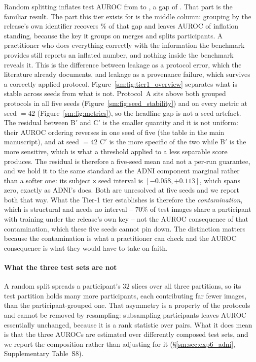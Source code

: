 \documentclass[11pt]{article}
\begin{document}
Random splitting inflates test AUROC from \TierOneTrueAUROC{} to
\TierOneRandomAUROC{}, a gap of \TierOneGapTotal{}. That part is the
familiar result. The part this tier exists for is the middle column:
grouping by the release's own identifier recovers
\TierOneShareFilename\% of that gap and leaves \TierOneGapResidual{}
AUROC of inflation standing, because the key it groups on merges and
splits participants. A practitioner who does everything correctly with
the information the benchmark provides still reports an inflated number,
and nothing inside the benchmark reveals it. This is the difference
between leakage as a protocol error, which the literature already
documents, and leakage as a provenance failure, which survives a
correctly applied protocol.
Figure~\ref{sm:fig:tier1_overview} separates what is stable across seeds
from what is not. Protocol~A sits above both grouped protocols in all
five seeds (Figure~\ref{sm:fig:seed_stability}) and on every metric at
seed $=42$ (Figure~\ref{sm:fig:metrics}), so the headline gap is not a
seed artefact. The residual between B$'$ and C$'$ is the smaller
quantity and it is not uniform: their AUROC ordering reverses in one
seed of five (the table in the main manuscript), and at seed $=42$ C$'$ is
the more specific of the two while B$'$ is the more sensitive, which is
what a threshold applied to a less separable score produces. The
\TierOneGapResidual{} residual is therefore a five-seed mean and not a
per-run guarantee, and we hold it to the same standard as the ADNI
component marginal rather than a softer one: its
subject\,$\times$\,seed interval is $[-0.058, +0.113]$, which spans
zero, exactly as ADNI's \AdniMarginal{} \AdniMarginalCI{} does. Both
are unresolved at five seeds and we report both that way. What the
Tier-1 tier establishes is therefore the \emph{contamination}, which is
structural and needs no interval -- $70\%$ of test images share a
participant with training under the release's own key -- not the AUROC
consequence of that contamination, which these five seeds cannot pin
down. The distinction matters because the contamination is what a
practitioner can check and the AUROC consequence is what they would
have to take on faith.



\paragraph{What the three test sets are not}
A random split spreads a participant's $32$ slices over all three
partitions, so its test partition holds many more participants, each
contributing far fewer images, than the participant-grouped one. That
asymmetry is a property of the protocols and cannot be removed by
resampling: subsampling participants leaves AUROC essentially
unchanged, because it is a rank statistic over pairs. What it does mean
is that the three AUROCs are estimated over differently composed test
sets, and we report the composition rather than adjusting for it
(\S\ref{sm:sec:exp6_adni}, Supplementary Table~S8).
\end{document}
